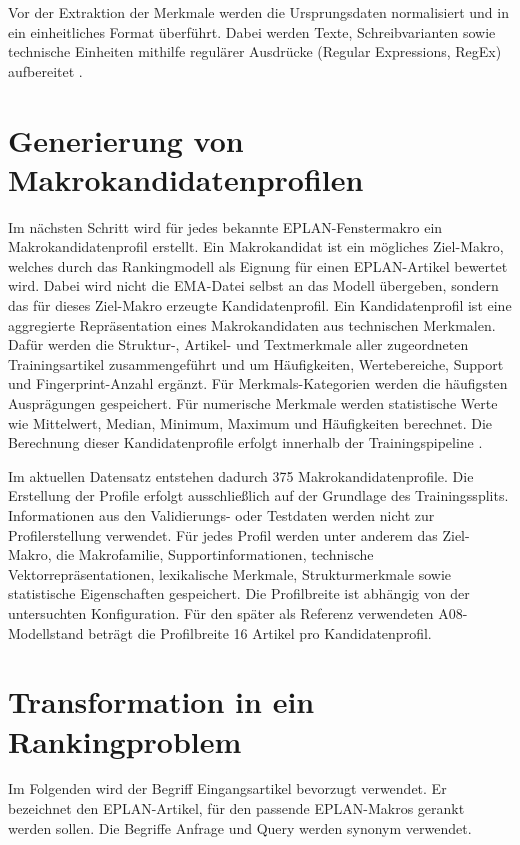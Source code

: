 Vor der Extraktion der Merkmale werden die Ursprungsdaten normalisiert und in ein einheitliches Format überführt. 
Dabei werden Texte, Schreibvarianten sowie technische Einheiten mithilfe regulärer Ausdrücke (Regular Expressions, RegEx) aufbereitet \parencite{srcStep911}.

\section{Generierung von Makrokandidatenprofilen}

Im nächsten Schritt wird für jedes bekannte EPLAN-Fenstermakro \parencite{EPLAN-Makros} ein Makrokandidatenprofil erstellt. Ein Makrokandidat ist ein mögliches Ziel-Makro, welches durch das Rankingmodell als Eignung für einen EPLAN-Artikel \parencite{EPLANArtikelverwaltung} bewertet wird. Dabei wird nicht die EMA-Datei selbst an das Modell übergeben, sondern das für dieses Ziel-Makro erzeugte Kandidatenprofil. Ein Kandidatenprofil ist eine aggregierte Repräsentation eines Makrokandidaten aus technischen Merkmalen. Dafür werden die Struktur-, Artikel- und Textmerkmale aller zugeordneten Trainingsartikel zusammengeführt und um Häufigkeiten, Wertebereiche, Support und Fingerprint-Anzahl ergänzt. Für Merkmals-Kategorien werden die häufigsten Ausprägungen gespeichert. Für numerische Merkmale werden statistische Werte wie Mittelwert, Median, Minimum, Maximum und Häufigkeiten berechnet. 
Die Berechnung dieser Kandidatenprofile erfolgt innerhalb der Trainingspipeline \parencite{srcStep931}.

Im aktuellen Datensatz entstehen dadurch 375 Makrokandidatenprofile. Die Erstellung der Profile erfolgt ausschließlich auf der Grundlage des Trainingssplits. 
Informationen aus den Validierungs- oder Testdaten werden nicht zur Profilerstellung verwendet. Für jedes Profil werden unter anderem das Ziel-Makro, die Makrofamilie, Supportinformationen, technische Vektorrepräsentationen, lexikalische Merkmale, Strukturmerkmale sowie statistische Eigenschaften gespeichert. 
Die Profilbreite ist abhängig von der untersuchten Konfiguration. Für den später als Referenz verwendeten A08-Modellstand beträgt die Profilbreite 16 Artikel pro Kandidatenprofil.

\section{Transformation in ein Rankingproblem}

Im Folgenden wird der Begriff Eingangsartikel bevorzugt verwendet. Er bezeichnet den EPLAN-Artikel, für den passende EPLAN-Makros gerankt werden sollen. Die Begriffe Anfrage und Query werden synonym verwendet.

